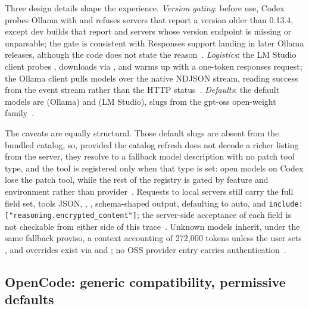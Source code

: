 \documentclass{article}
\newcommand{\codex}[0]{Codex}
\begin{document}
Three design details shape the experience. \emph{Version gating}: before
use, \codex{} probes Ollama with  and refuses
servers that report a version older than 0.13.4, except dev builds that
report  and servers whose version endpoint is missing or
unparsable; the gate is consistent with Responses support landing in
later Ollama releases, although the code does not state the
reason~\citep{codexRepo,ollamaCompatDocs}. \emph{Logistics}: the LM
Studio client probes , downloads via
, and warms up with a one-token responses request;
the Ollama client pulls models over the native  NDJSON
stream, reading success from the event stream rather than the HTTP
status~\citep{codexRepo}. \emph{Defaults}: the default models are
 (Ollama) and  (LM Studio),
slugs from the gpt-oss open-weight family~\citep{codexRepo}.

The caveats are equally structural. Those default slugs are absent from
the bundled catalog, so, provided the catalog refresh does not decode a
richer listing from the server, they resolve to a fallback model
description with no patch tool type, and the  tool is
registered only when that type is set: open models on \codex{} lose the
patch tool, while the rest of the registry is gated by feature and
environment rather than provider~\citep{codexRepo}. Requests to local
servers still carry the full field set, tools JSON,
, , schema-shaped
output,  defaulting to auto, and
\texttt{include: ["reasoning.encrypted\_content"]}; the server-side
acceptance of each field is not checkable from either side of this
trace~\citep{codexRepo,lmstudioApiDocs,llamaCppServerDocs}. Unknown
models inherit, under the same fallback proviso, a context accounting
of 272{,}000 tokens unless the user sets
, and overrides exist via
 and ; no OSS provider
entry carries authentication~\citep{codexRepo}.

\subsection{OpenCode: generic compatibility, permissive defaults}
\label{sec:opencode}
\end{document}
